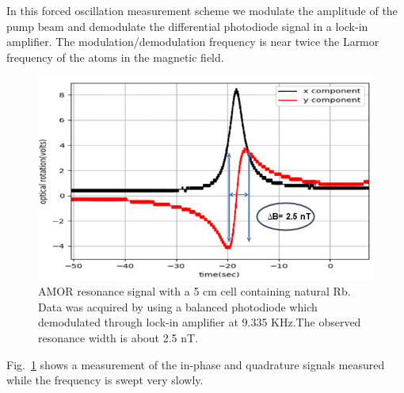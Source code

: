 In this forced oscillation measurement scheme we modulate the
amplitude of the pump beam and demodulate the differential photodiode
signal in a lock-in amplifier.  The modulation/demodulation frequency
is near twice the Larmor frequency of the atoms in the magnetic field.

\begin{figure}[h]
\centering\includegraphics[width=0.7\linewidth]{figures/AM_NMOR}
\caption{AMOR resonance signal with a 5 cm cell containing natural Rb.
  Data was acquired by using a balanced photodiode which demodulated
  through lock-in amplifier at 9.335 KHz.The observed resonance width
  is about 2.5 nT.\label{fig:AMOR}}
\end{figure} 

Fig.~\ref{fig:AMOR} shows a measurement of the in-phase and quadrature
signals measured while the frequency is swept very slowly.


